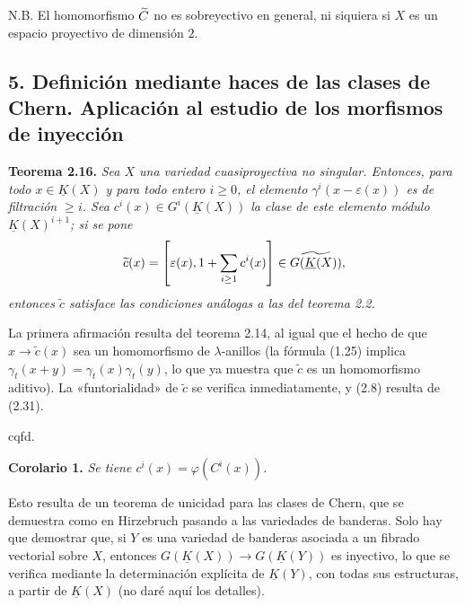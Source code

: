 N.B. El homomorfismo $\Ctil$ no es sobreyectivo en general, ni siquiera si $X$ es un espacio proyectivo de dimensión $2$.

\subsection*{5. Definición mediante haces de las clases de Chern. Aplicación al estudio de los morfismos de inyección}

\textbf{Teorema 2.16.} \emph{Sea $X$ una variedad cuasiproyectiva no singular. Entonces, para todo $x\in\underline K(X)$ y para todo entero $i\geq0$, el elemento $\gamma^i(x-\varepsilon(x))$ es de filtración $\geq i$. Sea $c^i(x)\in G^i(\underline K(X))$ la clase de este elemento módulo $\underline K(X)^{i+1}$; si se pone}
\[
 \widetilde c(x)=\left[\varepsilon(x),1+\sum_{i\geq\sisi{0}{1}}c^i(x)\right]\in\widetilde{G(\underline K(X))},
\]
\emph{entonces $\widetilde c$ satisface las condiciones análogas a las del teorema 2.2.}

La primera afirmación resulta del teorema 2.14, al igual que el hecho de que $x\longrightarrow\widetilde c(x)$ sea un homomorfismo de $\lambda$-anillos (la fórmula (1.25) implica $\gamma_t(x+y)=\gamma_t(x)\gamma_t(y)$, lo que ya muestra que $\widetilde c$ es un homomorfismo aditivo). La «funtorialidad» de $\widetilde c$ se verifica inmediatamente, y (2.8) resulta de (2.31).
\begin{flushright}cqfd.\end{flushright}

\textbf{Corolario 1.} \emph{Se tiene $c^i(x)=\varphi(C^i(x))$.}

Esto resulta de un teorema de unicidad para las clases de Chern, que se demuestra como en Hirzebruch pasando a las variedades de banderas. Solo hay que demostrar que, si $Y$ es una variedad de banderas asociada a un fibrado vectorial sobre $X$, entonces $G(\underline K(X))\longrightarrow G(\underline K(Y))$ es inyectivo, lo que se verifica mediante la determinación explícita de $\underline K(Y)$, con todas sus estructuras, a partir de $\underline K(X)$ (no daré aquí los detalles).

